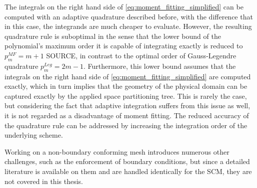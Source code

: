 The integrals on the right hand side of \ref{eq:moment_fitting_simplified} can be computed with an adaptive quadrature described before, with the difference that in this case, the integrands are much cheaper to evaluate. However, the resulting quadrature rule is suboptimal in the sense that the lower bound of the polynomial's maximum order it is capable of integrating exactly is reduced to $p_m^{MF}=m+1$ \cite{} SOURCE, in contrast to the optimal order of Gauss-Legendre quadrature $p_m^{Leg}=2m-1$.
Furthermore, this lower bound assumes that the integrals on the right hand side of \ref{eq:moment_fitting_simplified} are computed exactly, which in turn implies that the geometry of the physical domain can be captured exactly by the applied space partitioning tree. This is rarely the case, but considering the fact that adaptive integration suffers from this issue as well, it is not regarded as a disadvantage of moment fitting. The reduced accuracy of the quadrature rule can be addressed by increasing the integration order of the underlying scheme.


Working on a non-boundary conforming mesh introduces numerous other challenges, such as the enforcement of boundary conditions, but since a detailed literature is available on them \cite{Duester2007, Parvizian2007} and are handled identically for the SCM, they are not covered in this thesis.